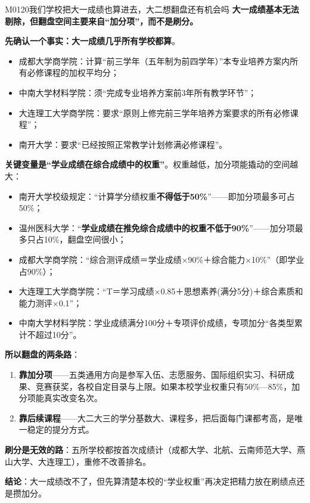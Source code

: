 \begin{qa}{M0120}{我们学校把大一成绩也算进去，大二想翻盘还有机会吗}
\textbf{大一成绩基本无法剔除，但翻盘空间主要来自“加分项”，而不是刷分。}

\textbf{先确认一个事实：大一成绩几乎所有学校都算}。
\begin{itemize}
  \item 成都大学商学院：计算“前三学年（五年制为前四学年）”本专业培养方案内所有必修课程的加权平均分；
  \item 中南大学材料学院：须“完成专业培养方案前3年所有教学环节”；
  \item 大连理工大学商学院：要求“原则上修完前三学年培养方案要求的所有必修课程”；
  \item 南开大学：要求“已经按照正常教学计划修满必修课程”。
\end{itemize}

\textbf{关键变量是“学业成绩在综合成绩中的权重”}。权重越低，加分项能撬动的空间越大：
\begin{itemize}
  \item 南开大学校级规定：“计算学分绩权重\textbf{不得低于50\%}”——即加分项最多可占50\%；
  \item 温州医科大学：“\textbf{学业成绩在推免综合成绩中的权重不低于90\%}”——加分项最多只占10\%，翻盘空间很小；
  \item 成都大学商学院：“综合测评成绩＝学业成绩×90\%＋综合能力×10\%”（即学业占90\%）；
  \item 大连理工大学商学院：“T＝学习成绩×0.85＋思想素养(满分5分)＋综合素质和能力测评×0.1”；
  \item 中南大学材料学院：学业成绩满分100分＋专项评价成绩，专项加分“各类型累计不超过10分”。
\end{itemize}

\textbf{所以翻盘的两条路}：
\begin{enumerate}
  \item \textbf{靠加分项}——五类通用方向是参军入伍、志愿服务、国际组织实习、科研成果、竞赛获奖，各校自定目录与上限。如果本校学业权重只有50\%—85\%，加分项能真实改变名次。
  \item \textbf{靠后续课程}——大二大三的学分基数大、课程多，把后面每门课都考高，是唯一稳定的提分方式。
\end{enumerate}

\textbf{刷分是无效的路}：五所学校都按首次成绩计（成都大学、北航、云南师范大学、燕山大学、大连理工），重修不改善排名。

\textbf{结论}：大一成绩改不了，但先算清楚本校的“学业权重”再决定把精力放在刷绩点还是攒加分。
\end{qa}

